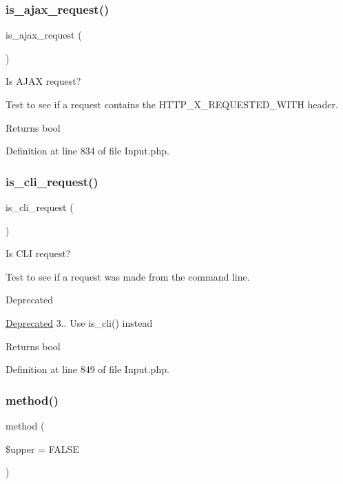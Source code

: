 \subsubsection{\texorpdfstring{is\_ajax\_request()}{is\_ajax\_request()}}
{\footnotesize\ttfamily is\+\_\+ajax\+\_\+request (\begin{DoxyParamCaption}{ }\end{DoxyParamCaption})}

Is A\+J\+AX request?

Test to see if a request contains the H\+T\+T\+P\+\_\+\+X\+\_\+\+R\+E\+Q\+U\+E\+S\+T\+E\+D\+\_\+\+W\+I\+TH header.

\begin{DoxyReturn}{Returns}
bool 
\end{DoxyReturn}


Definition at line 834 of file Input.\+php.

\mbox{\label{class_c_i___input_a70c1e8a081ef955c1a52164634d4f66e}} 
\subsubsection{\texorpdfstring{is\_cli\_request()}{is\_cli\_request()}}
{\footnotesize\ttfamily is\+\_\+cli\+\_\+request (\begin{DoxyParamCaption}{ }\end{DoxyParamCaption})}

Is C\+LI request?

Test to see if a request was made from the command line.

\begin{DoxyRefDesc}{Deprecated}
\item[\mbox{\hyperlink{deprecated__deprecated000002}{Deprecated}}]3.. Use is\+\_\+cli() instead \end{DoxyRefDesc}
\begin{DoxyReturn}{Returns}
bool 
\end{DoxyReturn}


Definition at line 849 of file Input.\+php.

\mbox{\label{class_c_i___input_aaa22626885bdf9dda2346ee6422203ef}} 
\subsubsection{\texorpdfstring{method()}{method()}}
{\footnotesize\ttfamily method (\begin{DoxyParamCaption}\item[{}]{\$upper = {\ttfamily FALSE} }\end{DoxyParamCaption})}

